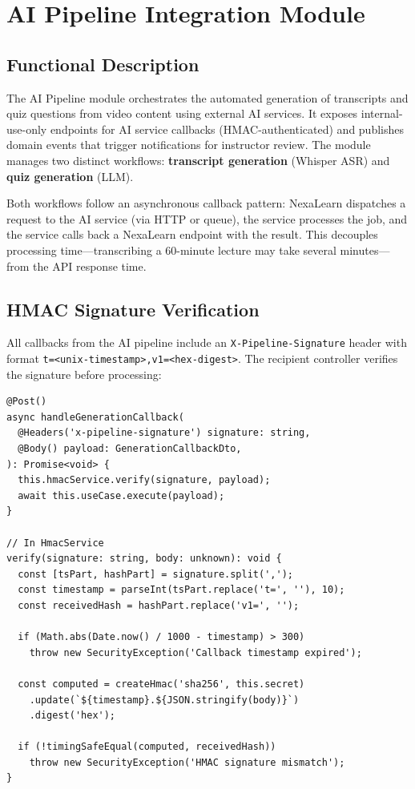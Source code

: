 
\section{AI Pipeline Integration Module}
\label{sec:ai-pipeline-module}

\subsection{Functional Description}

The AI Pipeline module orchestrates the automated generation of transcripts and quiz questions from video content using external AI services. It exposes internal-use-only endpoints for AI service callbacks (HMAC-authenticated) and publishes domain events that trigger notifications for instructor review. The module manages two distinct workflows: \textbf{transcript generation} (Whisper ASR) and \textbf{quiz generation} (LLM).

Both workflows follow an asynchronous callback pattern: NexaLearn dispatches a request to the AI service (via HTTP or queue), the service processes the job, and the service calls back a NexaLearn endpoint with the result. This decouples processing time---transcribing a 60-minute lecture may take several minutes---from the API response time.

\subsection{HMAC Signature Verification}

All callbacks from the AI pipeline include an \texttt{X-Pipeline-Signature} header with format \texttt{t=<unix-timestamp>,v1=<hex-digest>}. The recipient controller verifies the signature before processing:

\begin{lstlisting}[caption=HMAC Callback Verification,label=lst:hmac-verify]
@Post()
async handleGenerationCallback(
  @Headers('x-pipeline-signature') signature: string,
  @Body() payload: GenerationCallbackDto,
): Promise<void> {
  this.hmacService.verify(signature, payload);
  await this.useCase.execute(payload);
}

// In HmacService
verify(signature: string, body: unknown): void {
  const [tsPart, hashPart] = signature.split(',');
  const timestamp = parseInt(tsPart.replace('t=', ''), 10);
  const receivedHash = hashPart.replace('v1=', '');

  if (Math.abs(Date.now() / 1000 - timestamp) > 300)
    throw new SecurityException('Callback timestamp expired');

  const computed = createHmac('sha256', this.secret)
    .update(`${timestamp}.${JSON.stringify(body)}`)
    .digest('hex');

  if (!timingSafeEqual(computed, receivedHash))
    throw new SecurityException('HMAC signature mismatch');
}
\end{lstlisting}


